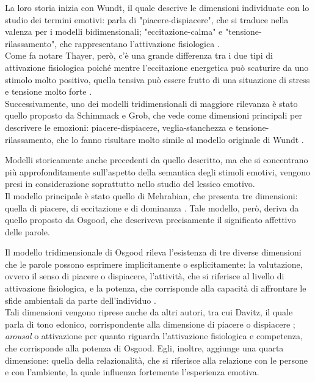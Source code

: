 La loro storia inizia con Wundt, il quale descrive le dimensioni individuate con lo studio dei termini emotivi: parla di "piacere-dispiacere", che si traduce nella valenza per i modelli bidimensionali; "eccitazione-calma" e "tensione-rilassamento", che rappresentano l'attivazione fisiologica \parencite{wundt}.\\
Come fa notare Thayer, però, c'è una grande differenza tra i due tipi di attivazione fisiologica poiché mentre l'eccitazione energetica può scaturire da uno stimolo molto positivo, quella tensiva può essere frutto di una situazione di stress e tensione molto forte \parencite{Thayer}.\\
Successivamente, uno dei modelli tridimensionali di maggiore rilevanza è stato quello proposto da Schimmack e Grob, che vede come dimensioni principali per descrivere le emozioni: piacere-dispiacere, veglia-stanchezza e tensione-rilassamento, che lo fanno risultare molto simile al modello originale di Wundt \parencite{Schimmack}. 

Modelli storicamente anche precedenti da quello descritto, ma che si concentrano più approfonditamente sull'aspetto della semantica degli stimoli emotivi, vengono presi in considerazione soprattutto nello studio del lessico emotivo.\\
Il modello principale è stato quello di Mehrabian, che presenta tre dimensioni: quella di piacere, di eccitazione e di dominanza \parencite{Mehrabian}. Tale modello, però, deriva da quello proposto da Osgood, che descriveva precisamente il significato affettivo delle parole.

Il modello tridimensionale di Osgood rileva l'esistenza di tre diverse dimensioni che le parole possono esprimere implicitamente o esplicitamente: la valutazione, ovvero il senso di piacere o dispiacere, l'attività, che si riferisce al livello di attivazione fisiologica, e la potenza, che corrisponde alla capacità di affrontare le sfide ambientali da parte dell'individuo \parencite{Osgood}. \\
Tali dimensioni vengono riprese anche da altri autori, tra cui Davitz, il quale parla di tono edonico, corrispondente alla dimensione di piacere o dispiacere \parencite{Davitz}; \textit{arousal} o attivazione per quanto riguarda l'attivazione fisiologica e competenza, che corrisponde alla potenza di Osgood. Egli, inoltre, aggiunge una quarta dimensione: quella della relazionalità, che si riferisce alla relazione con le persone e con l'ambiente, la quale influenza fortemente l'esperienza emotiva. 

